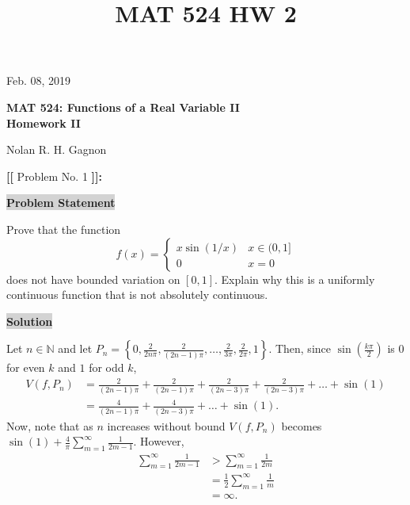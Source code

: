 \documentclass[12pt]{article}
\title{MAT 524 HW 2}
\newcommand{\mybox}{%
    \collectbox{%
        \setlength{\fboxsep}{2pt}%
        \fbox{\BOXCONTENT}%
    }%
}
\begin{document}
\hfill Feb. 08, 2019
\begin{center}
\begin{large}
\textbf{MAT 524: Functions of a Real Variable II \\
\vspace{-5mm}
Homework II \\}
\end{large}
\vspace{-2mm}
Nolan R. H. Gagnon \\
\end{center}

\vspace{5mm}

\noindent \textbf{{\huge [}{\Large [}} Problem No. 1 \textbf{{\Large ]}{\huge ]}}{\Large \textbf{:}}

\vspace{3mm}

\noindent\mybox{\colorbox{lightgray}{\textbf{Problem Statement}}}\hspace{3mm}\hrulefill

\noindent Prove that the function 
$$
f(x) =
\begin{cases}
x\sin(1/x) & x\in(0,1]\\
0 & x=0
\end{cases}
$$
does not have bounded variation on $[0,1]$. Explain why this is a uniformly continuous function that is not absolutely continuous.

\noindent\mybox{\colorbox{lightgray}{\textbf{Solution}}}\hspace{3mm}\hrulefill

\noindent Let $n\in\mathbb{N}$ and let $P_n = \left\lbrace 0, \frac{2}{2n\pi}, \frac{2}{(2n-1)\pi}, \ldots, \frac{2}{3\pi}, \frac{2}{2\pi}, 1\right\rbrace$. Then, since $\sin\left(\frac{k\pi}{2}\right)$ is $0$ for even $k$ and $1$ for odd $k$,
\begin{align}
    V(f, P_n) &= \frac{2}{(2n-1)\pi} + \frac{2}{(2n-1)\pi} + \frac{2}{(2n-3)\pi} + \frac{2}{(2n-3)\pi} + \ldots + \sin(1) \\
    &= \frac{4}{(2n-1)\pi} + \frac{4}{(2n-3)\pi} + \ldots + \sin(1).
\end{align}
\noindent Now, note that as $n$ increases without bound $V(f, P_n)$ becomes $\sin(1) + \frac{4}{\pi}\sum\limits_{m=1}^{\infty}\frac{1}{2m-1}$. However, 
\begin{align}
    \sum\limits_{m=1}^{\infty}\frac{1}{2m-1} &> \sum\limits_{m=1}^{\infty}\frac{1}{2m} \\
    &= \frac{1}{2}\sum\limits_{m=1}^{\infty}\frac{1}{m} \\
    &= \infty.
\end{align}
\end{document}
